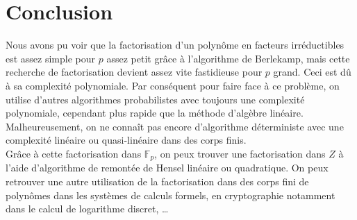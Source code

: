 \chapter{Conclusion}
\label{Conclusion}

	Nous avons pu voir que la factorisation d'un polynôme en facteurs irréductibles est assez simple pour $p$ assez petit grâce à l'algorithme de Berlekamp, mais cette recherche de factorisation devient assez vite fastidieuse pour $p$ grand. Ceci est dû à sa complexité polynomiale.
	Par conséquent pour faire face à ce problème, on utilise d'autres algorithmes probabilistes avec toujours une complexité polynomiale, cependant plus rapide que la méthode d'algèbre linéaire.
	Malheureusement, on ne connaît pas encore d'algorithme déterministe avec une complexité linéaire ou quasi-linéaire dans des corps finis.\\

	Grâce à cette factorisation dans $\mathbb{F}_{p}$, on peux trouver une factorisation dans $Z$ à l'aide d'algorithme de remontée de Hensel linéaire ou quadratique.
	On peux retrouver une autre utilisation de la factorisation dans des corps fini de polynômes dans les systèmes de calculs formels, en cryptographie notamment dans le calcul de logarithme discret, \ldots